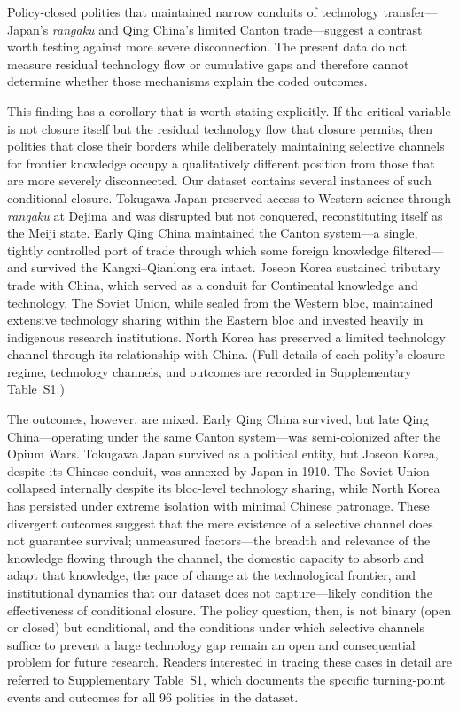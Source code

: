 \documentclass[pdflatex,sn-basic]{sn-jnl}
\theoremstyle{thmstyleone}%
\theoremstyle{thmstyletwo}%
\theoremstyle{thmstylethree}%
\begin{document}
Policy-closed polities that maintained narrow conduits of technology transfer---Japan's \emph{rangaku} and Qing China's limited Canton trade---suggest a contrast worth testing against more severe disconnection. The present data do not measure residual technology flow or cumulative gaps and therefore cannot determine whether those mechanisms explain the coded outcomes.

This finding has a corollary that is worth stating explicitly. If the critical variable is not closure itself but the residual technology flow that closure permits, then polities that close their borders while deliberately maintaining selective channels for frontier knowledge occupy a qualitatively different position from those that are more severely disconnected. Our dataset contains several instances of such conditional closure. Tokugawa Japan preserved access to Western science through \emph{rangaku} at Dejima and was disrupted but not conquered, reconstituting itself as the Meiji state. Early Qing China maintained the Canton system---a single, tightly controlled port of trade through which some foreign knowledge filtered---and survived the Kangxi--Qianlong era intact. Joseon Korea sustained tributary trade with China, which served as a conduit for Continental knowledge and technology. The Soviet Union, while sealed from the Western bloc, maintained extensive technology sharing within the Eastern bloc and invested heavily in indigenous research institutions. North Korea has preserved a limited technology channel through its relationship with China. (Full details of each polity's closure regime, technology channels, and outcomes are recorded in Supplementary Table~S1.)

The outcomes, however, are mixed. Early Qing China survived, but late Qing China---operating under the same Canton system---was semi-colonized after the Opium Wars. Tokugawa Japan survived as a political entity, but Joseon Korea, despite its Chinese conduit, was annexed by Japan in 1910. The Soviet Union collapsed internally despite its bloc-level technology sharing, while North Korea has persisted under extreme isolation with minimal Chinese patronage. These divergent outcomes suggest that the mere existence of a selective channel does not guarantee survival; unmeasured factors---the breadth and relevance of the knowledge flowing through the channel, the domestic capacity to absorb and adapt that knowledge, the pace of change at the technological frontier, and institutional dynamics that our dataset does not capture---likely condition the effectiveness of conditional closure. The policy question, then, is not binary (open or closed) but conditional, and the conditions under which selective channels suffice to prevent a large technology gap remain an open and consequential problem for future research. Readers interested in tracing these cases in detail are referred to Supplementary Table~S1, which documents the specific turning-point events and outcomes for all 96 polities in the dataset.
\end{document}
